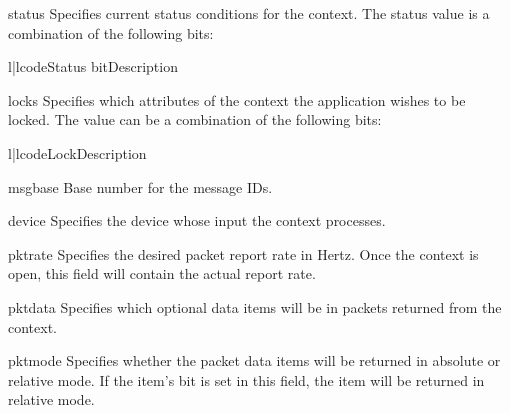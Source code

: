 \begin{memberdesc}{status}
Specifies current status conditions for the context. The status value
is a combination of the following bits:

\begin{tableii}{l|l}{code}{Status bit}{Description}
\end{tableii}
\end{memberdesc}

\begin{memberdesc}{locks}
Specifies which attributes of the context the application wishes to be 
locked. The value can be a combination of the following bits:

\begin{tableii}{l|l}{code}{Lock}{Description}
\end{tableii}
\end{memberdesc}

\begin{memberdesc}{msgbase}
Base number for the message IDs.
\end{memberdesc}

\begin{memberdesc}{device}
Specifies the device whose input the context processes.
\end{memberdesc}

\begin{memberdesc}{pktrate}
Specifies the desired packet report rate in Hertz. Once the context is open,
this field will contain the actual report rate.
\end{memberdesc}

\begin{memberdesc}{pktdata}
Specifies which optional data items will be in packets returned from the
context.
\end{memberdesc}

\begin{memberdesc}{pktmode}
Specifies whether the packet data items will be returned in absolute
or relative mode. If the item's bit is set in this field, the item will
be returned in relative mode.
\end{memberdesc}

